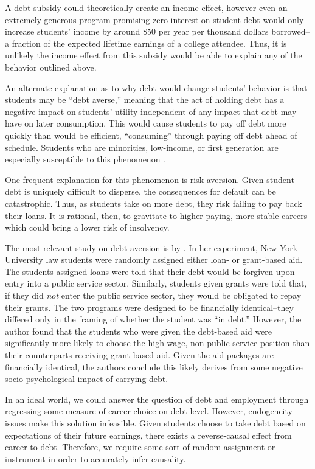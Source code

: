 \documentclass[12pt]{article}
\begin{document}
	A debt subsidy could theoretically create an income effect, however even an extremely generous program promising zero interest on student debt would only increase students' income by around \$50 per year per thousand dollars borrowed--a fraction of the expected lifetime earnings of a college attendee. Thus, it is unlikely the income effect from this subsidy would be able to explain any of the behavior outlined above.
	
	An alternate explanation as to why debt would change students' behavior is that students may be ``debt averse,'' meaning that the act of holding debt has a negative impact on students' utility independent of any impact that debt may have on later consumption. This would cause students to pay off debt more quickly than would be efficient, ``consuming'' through paying off debt ahead of schedule. Students who are minorities, low-income, or first generation are especially susceptible to this phenomenon \parencite{burdman2005, field2009, callender2005}. 
	
	One frequent explanation for this phenomenon is risk aversion. Given student debt is uniquely difficult to disperse, the consequences for default can be catastrophic. Thus, as students take on more debt, they risk failing to pay back their loans. It is rational, then, to gravitate to higher paying, more stable careers which could bring a lower risk of insolvency. 
	
	The most relevant study on debt aversion is by \textcite{field2009}. In her experiment, New York University law students were randomly assigned either loan- or grant-based aid. The students assigned loans were told that their debt would be forgiven upon entry into a public service sector. Similarly, students given grants were told that, if they did \emph{not} enter the public service sector, they would be obligated to repay their grants. The two programs were designed to be financially identical--they differed only in the framing of whether the student was ``in debt.'' However, the author found that the students who were given the debt-based aid were significantly more likely to choose the high-wage, non-public-service position than their counterparts receiving grant-based aid. Given the aid packages are financially identical, the authors conclude this likely derives from some negative socio-psychological impact of carrying debt.
	
	In an ideal world, we could answer the question of debt and employment through regressing some measure of career choice on debt level. However, endogeneity issues make this solution infeasible. Given students choose to take debt based on expectations of their future earnings, there exists a reverse-causal effect from career to debt. Therefore, we require some sort of random assignment or instrument in order to accurately infer causality. 
	
\end{document}

